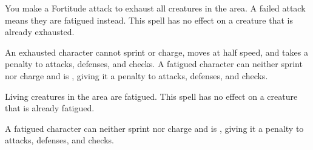 \spelldur{\durshort}
\begin{spelleffect}
    You make a Fortitude attack to exhaust all creatures in the area. A failed attack means they are fatigued instead. This spell has no effect on a creature that is already exhausted.
\end{spelleffect}
\begin{spellnotes}
    An exhausted character cannot sprint or charge, moves at half speed, and takes a  penalty to attacks, defenses, and checks. A fatigued character can neither sprint nor charge and is \vulnerable, giving it a  penalty to attacks, defenses, and checks.
\end{spellnotes}

\spelldur{\durshort}
\begin{spelleffect}
    Living creatures in the area are fatigued. This spell has no effect on a creature that is already fatigued.
\end{spelleffect}
\begin{spellnotes}
    A fatigued character can neither sprint nor charge and is \vulnerable, giving it a  penalty to attacks, defenses, and checks.
\end{spellnotes}


